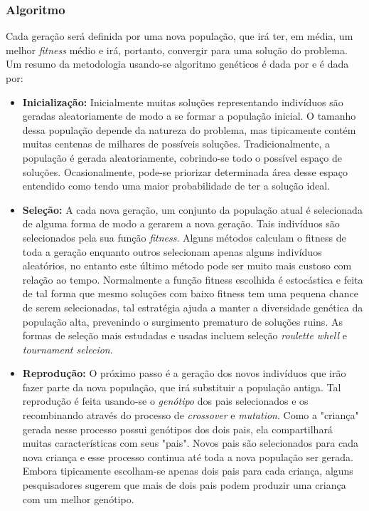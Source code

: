 \documentclass[review]{elsarticle}
\begin{document}
\subsubsection{Algoritmo}

Cada geração será definida por uma nova população, que irá ter, em média, um melhor \textit{fitness} médio e irá, portanto, convergir para uma solução do problema. Um resumo da metodologia usando-se algoritmo genéticos é dada por \cite{Kumar2010} e é dada por:
\begin{itemize}
    \item \textbf{Inicialização:} Inicialmente muitas soluções representando indivíduos são geradas aleatoriamente de modo a se formar a população inicial. O tamanho dessa população depende da natureza do problema, mas tipicamente contém muitas centenas de milhares de possíveis soluções. Tradicionalmente, a população é gerada aleatoriamente, cobrindo-se todo o possível espaço de soluções. Ocasionalmente, pode-se priorizar determinada área desse espaço entendido como tendo uma maior probabilidade de ter a solução ideal.
    \item \textbf{Seleção:} A cada nova geração, um conjunto da população atual é selecionada de alguma forma de modo a gerarem a nova geração. Tais indivíduos são selecionados pela sua função \textit{fitness}. Alguns métodos calculam o fitness de toda a geração enquanto outros selecionam apenas alguns indivíduos aleatórios, no entanto este último método pode ser muito mais custoso com relação ao tempo.
    Normalmente a função fitness escolhida é estocástica e feita de tal forma que mesmo soluções com baixo fitness tem uma pequena chance de serem selecionadas, tal estratégia ajuda a manter a diversidade genética da população alta, prevenindo o surgimento prematuro de soluções ruins. As formas de seleção mais estudadas e usadas incluem seleção \textit{roulette whell} e \textit{tournament selecion}.
    \item \textbf{Reprodução:} O próximo passo é a geração dos novos indivíduos que irão fazer parte da nova população, que irá substituir a população antiga. Tal reprodução é feita usando-se o \textit{genótipo} dos pais selecionados e os recombinando através do processo de \textit{crossover} e \textit{mutation}.
    Como a "criança" gerada nesse processo possui genótipos dos dois pais, ela compartilhará muitas características com seus "pais". Novos pais são selecionados para cada nova criança e esse processo continua até toda a nova população ser gerada. Embora tipicamente escolham-se apenas dois pais para cada criança, alguns pesquisadores \cite{Eiben2012} sugerem que mais de dois pais podem produzir uma criança com um melhor genótipo.
\end{itemize}
\end{document}
